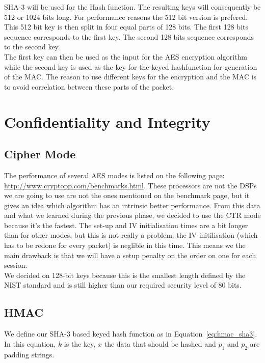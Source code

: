 \documentclass[a4paper]{article}
\begin{document}
SHA-3 will be used for the Hash function. The resulting keys will consequently be 512 or 1024 bits long. For performance reasons the 512 bit version is prefered. This 512 bit key is then split in four equal parts of 128 bits. The first 128 bits sequence corresponds to the first key. The second 128 bits sequence corresponds to the second key.\\

The first key can then be used as the input for the AES encryption algorithm while the second key is used as the key for the keyed hashfunction for generation of the MAC. The reason to use different keys for the encryption and the MAC is to avoid correlation between these parts of the packet.

\section{Confidentiality and Integrity}

\subsection{Cipher Mode}

The performance of several AES modes is listed on the following page: \url{http://www.cryptopp.com/benchmarks.html}. These processors are not the DSPs we are going to use are not the ones mentioned on the benchmark page, but it gives an idea which algorithm has an intrinsic better performance. From this data and what we learned during the previous phase, we decided to use the CTR mode because it's the fastest. The set-up and IV initialisation times are a bit longer than for other modes, but this is not really a problem: the IV initilisation (which has to be redone for every packet) is neglible in this time. This means we the main drawback is that we will have a setup penalty on the order on one {\micro\second} for each session.\\

We decided on 128-bit keys because this is the smallest length defined by the NIST standard and is still higher than our required security level of 80 bits.

\subsection{HMAC}

We define our SHA-3 based keyed hash function as in Equation~\ref{eq:hmac_sha3}. In this equation, $k$ is the key, $x$ the data that should be hashed and $p_1$ and $p_2$ are padding strings.
\end{document}
